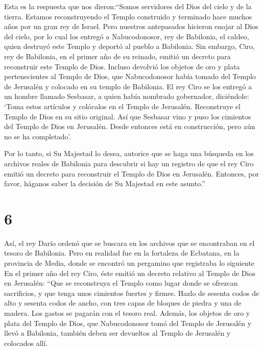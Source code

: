  Esta es la respuesta que nos dieron:``Somos servidores del
Dios del cielo y de la tierra. Estamos reconstruyendo el Templo
construido y terminado hace muchos años por un gran rey de Israel.
 Pero nuestros antepasados hicieron enojar al Dios del
cielo, por lo cual los entregó a Nabucodonosor, rey de Babilonia, el
caldeo, quien destruyó este Templo y deportó al pueblo a Babilonia.
 Sin embargo, Ciro, rey de Babilonia, en el primer año de
su reinado, emitió un decreto para reconstruir este Templo de Dios.
 Incluso devolvió los objetos de oro y plata pertenecientes
al Templo de Dios, que Nabucodonosor había tomado del Templo de
Jerusalén y colocado en su templo de Babilonia. El rey Ciro se los
entregó a un hombre llamado Sesbasar, a quien había nombrado gobernador,
 diciéndole: `Toma estos artículos y colócalos en el Templo
de Jerusalén. Reconstruye el Templo de Dios en su sitio original.
 Así que Sesbasar vino y puso los cimientos del Templo de
Dios en Jerusalén. Desde entonces está en construcción, pero aún no se
ha completado'.

 Por lo tanto, si Su Majestad lo desea, autorice que se
haga una búsqueda en los archivos reales de Babilonia para descubrir si
hay un registro de que el rey Ciro emitió un decreto para reconstruir el
Templo de Dios en Jerusalén. Entonces, por favor, háganos saber la
decisión de Su Majestad en este asunto.''

\hypertarget{section-5}{%
\section{6}\label{section-5}}

 Así, el rey Darío ordenó que se buscara en los archivos que
se encontraban en el tesoro de Babilonia.  Pero en realidad
fue en la fortaleza de Ecbatana, en la provincia de Media, donde se
encontró un pergamino que registraba lo siguiente  En el
primer año del rey Ciro, éste emitió un decreto relativo al Templo de
Dios en Jerusalén: ``Que se reconstruya el Templo como lugar donde se
ofrezcan sacrificios, y que tenga unos cimientos fuertes y firmes. Hazlo
de sesenta codos de alto y sesenta codos de ancho,  con tres
capas de bloques de piedra y una de madera. Los gastos se pagarán con el
tesoro real.  Además, los objetos de oro y plata del Templo
de Dios, que Nabucodonosor tomó del Templo de Jerusalén y llevó a
Babilonia, también deben ser devueltos al Templo de Jerusalén y
colocados allí.

